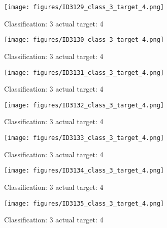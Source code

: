 \begin{figure}[h!]
\begin{center}
\texttt{[image: figures/ID3129\_class\_3\_target\_4.png]}
\end{center}
\caption{ Classification: 3 actual target: 4}
\label{fig:ID3129_class_3_target_4}
\end{figure}
\begin{figure}[h!]
\begin{center}
\texttt{[image: figures/ID3130\_class\_3\_target\_4.png]}
\end{center}
\caption{ Classification: 3 actual target: 4}
\label{fig:ID3130_class_3_target_4}
\end{figure}
\begin{figure}[h!]
\begin{center}
\texttt{[image: figures/ID3131\_class\_3\_target\_4.png]}
\end{center}
\caption{ Classification: 3 actual target: 4}
\label{fig:ID3131_class_3_target_4}
\end{figure}
\begin{figure}[h!]
\begin{center}
\texttt{[image: figures/ID3132\_class\_3\_target\_4.png]}
\end{center}
\caption{ Classification: 3 actual target: 4}
\label{fig:ID3132_class_3_target_4}
\end{figure}
\begin{figure}[h!]
\begin{center}
\texttt{[image: figures/ID3133\_class\_3\_target\_4.png]}
\end{center}
\caption{ Classification: 3 actual target: 4}
\label{fig:ID3133_class_3_target_4}
\end{figure}
\begin{figure}[h!]
\begin{center}
\texttt{[image: figures/ID3134\_class\_3\_target\_4.png]}
\end{center}
\caption{ Classification: 3 actual target: 4}
\label{fig:ID3134_class_3_target_4}
\end{figure}
\begin{figure}[h!]
\begin{center}
\texttt{[image: figures/ID3135\_class\_3\_target\_4.png]}
\end{center}
\caption{ Classification: 3 actual target: 4}
\label{fig:ID3135_class_3_target_4}
\end{figure}
